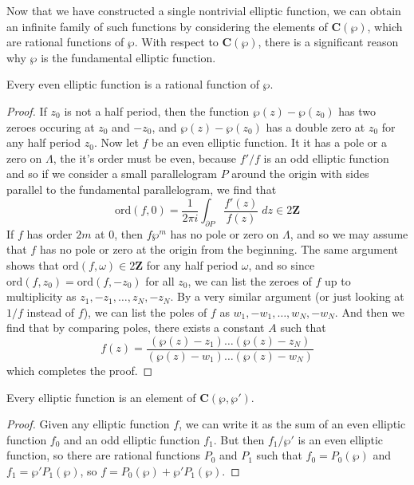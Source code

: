 Now that we have constructed a single nontrivial elliptic function, we can obtain an infinite family of such functions by considering the elements of $\mathbf{C}(\wp)$, which are rational functions of $\wp$. With respect to $\mathbf{C}(\wp)$, there is a significant reason why $\wp$ is the fundamental elliptic function.

\begin{theorem}
    Every even elliptic function is a rational function of $\wp$.
\end{theorem}
\begin{proof}
    If $z_0$ is not a half period, then the function $\wp(z) - \wp(z_0)$ has two zeroes occuring at $z_0$ and $-z_0$, and $\wp(z) - \wp(z_0)$ has a double zero at $z_0$ for any half period $z_0$. Now let $f$ be an even elliptic function. It it has a pole or a zero on $\Lambda$, the it's order must be even, because $f'/f$ is an odd elliptic function and so if we consider a small parallelogram $P$ around the origin with sides parallel to the fundamental parallelogram, we find that
    \[ \text{ord}(f,0) = \frac{1}{2 \pi i} \int_{\partial P} \frac{f'(z)}{f(z)}\; dz \in 2 \mathbf{Z} \]
    If $f$ has order $2m$ at $0$, then $f \wp^m$ has no pole or zero on $\Lambda$, and so we may assume that $f$ has no pole or zero at the origin from the beginning. The same argument shows that $\text{ord}(f,\omega) \in 2 \mathbf{Z}$ for any half period $\omega$, and so since $\text{ord}(f,z_0) = \text{ord}(f,-z_0)$ for all $z_0$, we can list the zeroes of $f$ up to multiplicity as $z_1,-z_1, \dots, z_N,-z_N$. By a very similar argument (or just looking at $1/f$ instead of $f$), we can list the poles of $f$ as $w_1, -w_1, \dots, w_N, -w_N$. And then we find that by comparing poles, there exists a constant $A$ such that
    \[ f(z) = \frac{(\wp(z) - z_1) \dots (\wp(z) - z_N)}{(\wp(z) - w_1) \dots (\wp(z) - w_N)} \]
    which completes the proof.
\end{proof}

\begin{corollary}
    Every elliptic function is an element of $\mathbf{C}(\wp,\wp')$.
\end{corollary}
\begin{proof}
    Given any elliptic function $f$, we can write it as the sum of an even elliptic function $f_0$ and an odd elliptic function $f_1$. But then $f_1/\wp'$ is an even elliptic function, so there are rational functions $P_0$ and $P_1$ such that $f_0 = P_0(\wp)$ and $f_1 = \wp' P_1(\wp)$, so $f = P_0(\wp) + \wp' P_1(\wp)$.
\end{proof}

